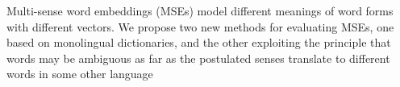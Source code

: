 Multi-sense word embeddings (MSEs) model different meanings of word forms with different vectors. We propose two new methods for evaluating MSEs, one based on monolingual dictionaries, and the other exploiting the principle that words may be ambiguous as far as the postulated senses translate to different words in some other language
